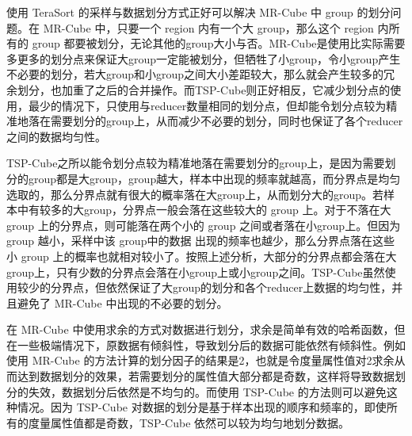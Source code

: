 



使用 TeraSort 的采样与数据划分方式正好可以解决 MR-Cube 中 group 的划分问题。在 MR-Cube 中，只要一个 region 内有一个大 group，那么这个 region 内所有的 group 都要被划分，无论其他的group大小与否。MR-Cube是使用比实际需要多更多的划分点来保证大group一定能被划分，但牺牲了小group，令小group产生不必要的划分，若大group和小group之间大小差距较大，那么就会产生较多的冗余划分，也加重了之后的合并操作。而TSP-Cube则正好相反，它减少划分点的使用，最少的情况下，只使用与reducer数量相同的划分点，但却能令划分点较为精准地落在需要划分的group上，从而减少不必要的划分，同时也保证了各个reducer之间的数据均匀性。

TSP-Cube之所以能令划分点较为精准地落在需要划分的group上，是因为需要划分的group都是大group，group越大，样本中出现的频率就越高，而分界点是均匀选取的，那么分界点就有很大的概率落在大group上，从而划分大的group。若样本中有较多的大group，分界点一般会落在这些较大的 group 上。对于不落在大 group 上的分界点，则可能落在两个小的 group 之间或者落在小group上。但因为 group 越小，采样中该 group中的数据 出现的频率也越少，那么分界点落在这些小 group 上的概率也就相对较小了。按照上述分析，大部分的分界点都会落在大group上，只有少数的分界点会落在小group上或小group之间。TSP-Cube虽然使用较少的分界点，但依然保证了大group的划分和各个reducer上数据的均匀性，并且避免了 MR-Cube 中出现的不必要的划分。

在 MR-Cube 中使用求余的方式对数据进行划分，求余是简单有效的哈希函数，但在一些极端情况下，原数据有倾斜性，导致划分后的数据可能依然有倾斜性。例如使用 MR-Cube 的方法计算的划分因子的结果是2，也就是令度量属性值对2求余从而达到数据划分的效果，若需要划分的属性值大部分都是奇数，这样将导致数据划分的失效，数据划分后依然是不均匀的。而使用 TSP-Cube 的方法则可以避免这种情况。因为 TSP-Cube 对数据的划分是基于样本出现的顺序和频率的，即使所有的度量属性值都是奇数，TSP-Cube 依然可以较为均匀地划分数据。


